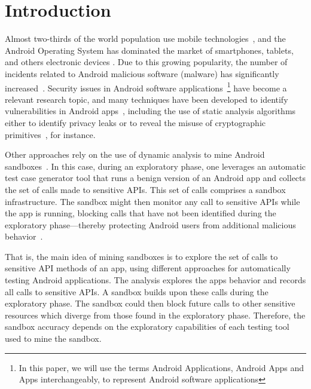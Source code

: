 \section{Introduction}\label{sec:introduction}

Almost two-thirds of the world population use mobile technologies~\cite{Comscore}, and the Android Operating System has dominated the market of smartphones, tablets, and others electronic devices \cite{statcounter}. Due to this growing popularity, the number of incidents related to Android malicious software (malware) has significantly increased~\cite{DBLP:journals/comsur/FarukiBLGGCR15,DBLP:journals/csur/SufatrioTCT15}. Security issues in Android software applications~\footnote{In this paper, we will use the terms Android Applications, Android Apps and Apps interchangeably, to represent Android software applications} have become a relevant research topic, and many techniques have been developed to identify vulnerabilities in Android apps~\cite{DBLP:conf/pldi/ArztRFBBKTOM14}, including the use of static analysis algorithms either to identify privacy leaks or to reveal the misuse of cryptographic primitives~\cite{krueger:ecoop-2018,rahaman:ccs-2019}, for instance.

Other approaches rely on the use of dynamic analysis to mine Android sandboxes~\cite{DBLP:conf/icse/JamrozikSZ16}. In this case, during an exploratory phase, one leverages an automatic test case generator tool that runs a benign version of an Android app and collects the set of calls made to sensitive APIs. This set of calls comprises a sandbox infrastructure. The sandbox might then monitor any call to sensitive APIs while the app is running, blocking calls that have not been identified during the exploratory phase---thereby protecting Android users from additional malicious behavior~\cite{DBLP:conf/icse/JamrozikSZ16}.

That is, the main idea of mining sandboxes is to explore the set of calls to sensitive API methods of an app, using different approaches
for automatically testing Android applications. The analysis explores the apps behavior and records all calls to sensitive APIs.
A sandbox builds upon these calls during the exploratory phase. The sandbox could then block future calls to
other sensitive resources which diverge from those found in the exploratory phase. Therefore, the sandbox accuracy depends on the exploratory capabilities of each testing tool
used to mine the sandbox.
  
